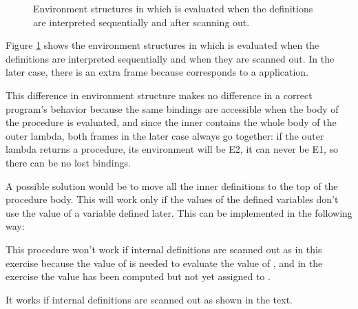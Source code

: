 \begin{exe}[4.17]
\begin{figure}
        \caption{Environment structures in which  is evaluated when 
        the definitions are interpreted sequentially and after scanning out.}
        \label{4.17fig}
    \end{figure}
    Figure \ref{4.17fig} shows the environment structures in which  
    is evaluated when the definitions are interpreted sequentially and when they 
    are scanned out. In the later case, there is an extra frame because 
     corresponds to a  application.

    This difference in environment structure makes no difference in a correct 
    program’s behavior because the same bindings are accessible when the body of 
    the procedure is evaluated, and since the inner  contains the 
    whole body of the outer lambda, both frames in the later case always go 
    together: if the outer lambda returns a procedure, its environment will be 
    E2, it can never be E1, so there can be no lost bindings.

    A possible solution would be to move all the inner definitions to the top of 
    the procedure body. This will work only if the values of the defined 
    variables don’t use the value of a variable defined later. This can be 
    implemented in the following way:
\end{exe}

\begin{exe}[4.18]
    This procedure won’t work if internal definitions are scanned out as in this 
    exercise because the value of  is needed to evaluate the value of 
    , and in the exercise the value has been computed but not yet 
    assigned to .

    It works if internal definitions are scanned out as shown in the text.
\end{exe}

